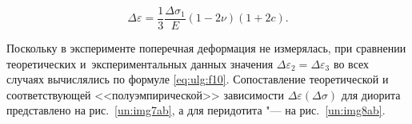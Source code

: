 \begin{equation} \label{eq:ulg:f10} 

\Delta\varepsilon=\frac{1}{3}\frac{\Delta\sigma_1}{E}(1-2\nu)(1+2c). 

\end{equation}

 

Поскольку в эксперименте  поперечная деформация  не измерялась, при сравнении теоретических и~экспериментальных данных значения $\Delta\varepsilon_2=\Delta\varepsilon_3$ во всех случаях вычислялись по формуле \eqref{eq:ulg:f10}. Сопоставление теоретической и соответствующей <<полуэмпирической>> зависимости  $\Delta\varepsilon(\Delta\sigma)$ для диорита представлено на рис.~\ref{un:img7ab}, а для перидотита "--- на рис.~\ref{un:img8ab}. 







